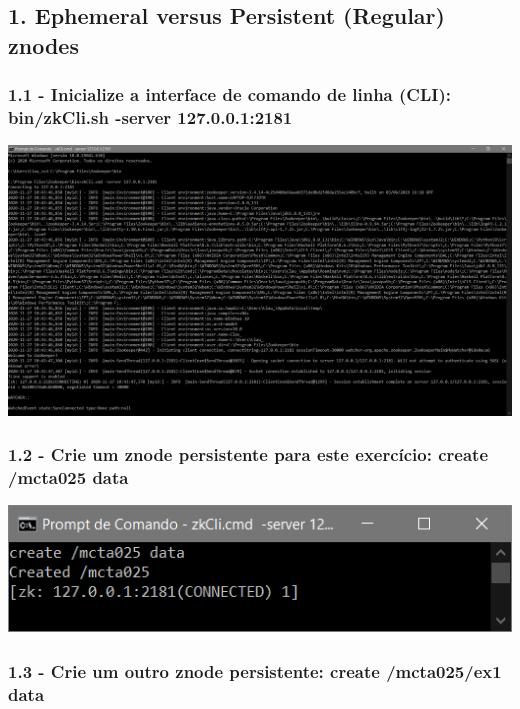 \subsection*{1. Ephemeral versus Persistent (Regular) znodes}

\subsubsection{1.1 - Inicialize a interface de comando de linha (CLI): bin/zkCli.sh
-server 127.0.0.1:2181}

\includegraphics[width=20cm]{pratica3/prints/client1_started.PNG}

\subsubsection{1.2 - Crie um znode persistente para este exercício: create /mcta025 data}

\includegraphics{pratica3/prints/roteiro 1.2.PNG}

\subsubsection{1.3 - Crie um outro znode persistente: create /mcta025/ex1 data}

